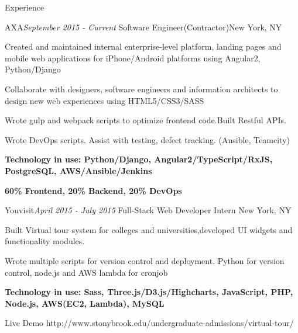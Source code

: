 \documentclass{resume} %
\begin{document}
\begin{rSection}{Experience}
\begin{rSubsection}{AXA}{\em September 2015 - Current }{Software Engineer(Contractor)}{New York, NY}
\item Created and maintained internal enterprise-level platform, landing pages and mobile web applications for iPhone/Android platforms using Angular2, Python/Django
\item Collaborate with designers, software engineers and information architects to design new web experiences using HTML5/CSS3/SASS
\item Wrote gulp and webpack scripts to optimize frontend code.Built Restful APIs.
\item Wrote DevOps scripts. Assist with testing, defect tracking. (Ansible, Teamcity)
\item {\bf Technology in use: Python/Django, Angular2/TypeScript/RxJS, PostgreSQL, AWS/Ansible/Jenkins }
\item {\bf 60\% Frontend, 20\% Backend, 20\% DevOps }

\end{rSubsection}

\begin{rSubsection}{Youvisit}{\em April 2015 - July 2015 }{Full-Stack Web Developer Intern}{ New York, NY}
\item Built Virtual tour system for colleges and universities,developed UI widgets and functionality modules.
\item Wrote multiple scripts for version control and deployment. Python for version control, node.js and AWS lambda for cronjob
\item {\bf Technology in use: Sass, Three.js/D3.js/Highcharts, JavaScript, PHP, Node.js, AWS(EC2, Lambda), MySQL}

\item Live Demo http://www.stonybrook.edu/undergraduate-admissions/virtual-tour/
\end{rSubsection}



\end{rSection}
\end{document}
